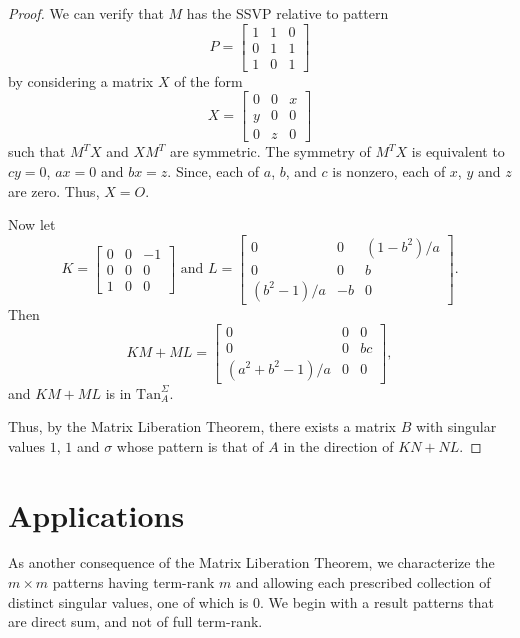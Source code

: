 \documentclass[preprint,12pt]{elsarticle}
\begin{document}
\begin{proof}
We can verify that $M$ has the SSVP relative to 
pattern 
\[
P=\left[ \begin{array}{ccc}
1 & 1& 0 \\
0 & 1 & 1 \\
1 & 0 & 1
\end{array} 
\right] 
\]
 by considering a matrix $X$ of the 
form
\[ 
X= \left[ \begin{array}{ccc} 0 & 0 & x \\ y & 0 & 0 \\ 0 & z & 0 
\end{array} \right] 
\]
such that $M^TX$ and $XM^T$ are symmetric.
The symmetry of $M^TX$ is equivalent to $cy=0$, $ax=0$ and $bx=z$.
Since, each of $a$, $b$, and $c$ is nonzero, each of $x$, $y$ and $z$ are zero.  Thus, $X=O$.

Now let 
\[
K= 
\left[ \begin{array}{rrr}
0 & 0 & -1 \\
0 & 0 & 0 \\
1 & 0 & 0 \end{array} 
\right] 
\mbox{ and } L= \left[ \begin{array}{ccc} 
0 & 0 & (1-b^2)/a 
\\
0 & 0 & b \\
(b^2-1)/a & -b & 0 
\end{array} \right].
\]
Then 
\[ 
KM+ML= \left[ 
\begin{array}{ccc}
0 & 0 & 0 \\
0 & 0 & bc\\
(a^2 + b^2 -1)/a & 
0 & 0 
\end{array} 
\right],
\]
and $KM+ML$ is in $\mbox{Tan}^{\Sigma}_A$.


Thus, by the Matrix Liberation Theorem,
there exists a matrix $B$ with singular values $1$, $1$ and $\sigma$ whose pattern is that of $A$ in the direction of $KN+NL$. 
\end{proof}

\section{Applications}
As another consequence of the Matrix Liberation Theorem, we characterize the $m\times m$
patterns having term-rank $m$ and allowing each prescribed collection of distinct singular values, one of which is $0$. We begin with a result patterns that are direct sum, and not of full term-rank. 
\end{document}

